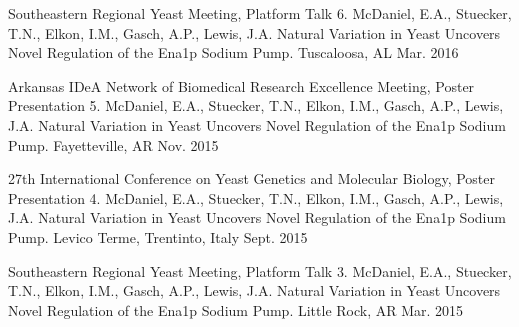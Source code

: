 

\begin{cventries}

  \cventry
    {Southeastern Regional Yeast Meeting, Platform Talk} %
    {6. McDaniel, E.A., Stuecker, T.N., Elkon, I.M., Gasch, A.P., Lewis, J.A. Natural Variation
in Yeast Uncovers Novel Regulation of the Ena1p Sodium Pump.} %
    {Tuscaloosa, AL} %
    {Mar. 2016} %
    {
      \begin{cvitems} %
      \end{cvitems}
    }
  \cventry
    {Arkansas IDeA Network of Biomedical Research Excellence Meeting, Poster Presentation} %
    {5. McDaniel, E.A., Stuecker, T.N., Elkon, I.M., Gasch, A.P., Lewis, J.A. Natural Variation
in Yeast Uncovers Novel Regulation of the Ena1p Sodium Pump.} %
    {Fayetteville, AR} %
    {Nov. 2015} %
    {
      \begin{cvitems} %
      \end{cvitems}
    }
  \cventry
    {27th International Conference on Yeast Genetics and Molecular Biology, Poster Presentation} %
    {4. McDaniel, E.A., Stuecker, T.N., Elkon, I.M., Gasch, A.P., Lewis, J.A. Natural Variation
in Yeast Uncovers Novel Regulation of the Ena1p Sodium Pump.} %
    {Levico Terme, Trentinto, Italy} %
    {Sept. 2015} %
    {
      \begin{cvitems} %
      \end{cvitems}
    }
  \cventry
    {Southeastern Regional Yeast Meeting, Platform Talk} %
    {3. McDaniel, E.A., Stuecker, T.N., Elkon, I.M., Gasch, A.P., Lewis, J.A. Natural Variation
in Yeast Uncovers Novel Regulation of the Ena1p Sodium Pump.} %
    {Little Rock, AR} %
    {Mar. 2015} %
    {
      \begin{cvitems} %
      \end{cvitems}
}
\end{cventries}
